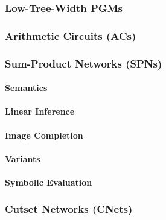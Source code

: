 			\subsubsection{Low-Tree-Width PGMs} %

			\subsubsection{Arithmetic Circuits (ACs)} %

			\subsubsection{Sum-Product Networks (SPNs)} %

				\paragraph{Semantics} %

				\paragraph{Linear Inference} %

				\paragraph{Image Completion} %

				\paragraph{Variants} %

				\paragraph{Symbolic Evaluation} %

			\subsubsection{Cutset Networks (CNets)} %

